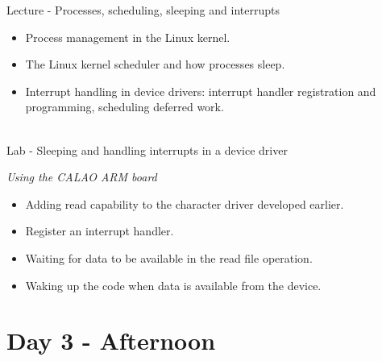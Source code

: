 \documentclass[a4paper,12pt,obeyspaces,spaces,hyphens]{article}
\begin{document}
\feagendaonecolumn
{Lecture - Processes, scheduling, sleeping and interrupts}
{
  \begin{itemize}
  \item Process management in the Linux kernel.
  \item The Linux kernel scheduler and how processes sleep.
  \item Interrupt handling in device drivers: interrupt handler
    registration and programming, scheduling deferred work.
  \end{itemize}
}
\\
\feagendaonecolumn
{Lab - Sleeping and handling interrupts in a device driver}
{
  {\em Using the CALAO ARM board}
  \begin{itemize}
  \item Adding read capability to the character driver developed
    earlier.
  \item Register an interrupt handler.
  \item Waiting for data to be available in the read file operation.
  \item Waking up the code when data is available from the device.
  \end{itemize}
}

\section{Day 3 - Afternoon}
\end{document}
